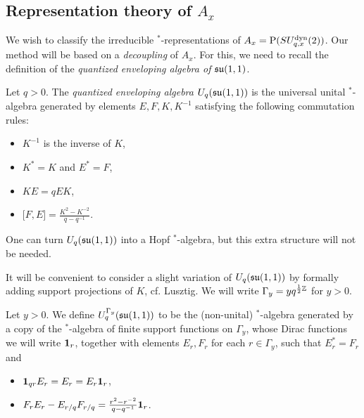 \subsection{Representation theory of $A_x$}

We wish to classify the irreducible $^*$-representations of $A_x= \operatorname{\mathrm{P}}(SU_{q,x}^{\operatorname{\mathrm{dyn}}}(2))$. Our method will be based on a \emph{decoupling} of $A_x$. For this, we need to recall the definition of the \emph{quantized enveloping algebra of $\mathfrak{su}(1,1)$}. %

\begin{Def} Let $q>0$. The \emph{quantized enveloping algebra $U_q(\mathfrak{su}(1,1))$} is the universal unital $^*$-algebra generated by elements $E,F,K,K^{-1}$ satisfying the following commutation rules: 
\begin{itemize}
\item $K^{-1}$ is the inverse of $K$, 
\item $K^* = K$ and $E^* = F$, 
\item $KE = qEK$,
\item $\lbrack F,E\rbrack = \frac{K^2-K^{-2}}{q-q^{-1}}$.
\end{itemize}
\end{Def}

One can turn $U_q(\mathfrak{su}(1,1))$ into a Hopf $^*$-algebra, but this extra structure will not be needed. 

It will be convenient to consider a slight variation of $U_q(\mathfrak{su}(1,1))$ by formally adding support projections of $K$, cf. Lusztig. We will write $\Gamma_y = yq^{\frac{1}{2}\mathbb{Z}}$  for $y>0$.

\begin{Def} Let $y>0$. We define $U_q^{\Gamma_y}(\mathfrak{su}(1,1))$ to be the (non-unital) $^*$-algebra generated by a copy of the $^*$-algebra of finite support functions on $\Gamma_y$, whose Dirac functions we will write $\mathbf{1}_r$, together with elements $E_{r},F_r$ for each $r\in \Gamma_y$, such that $E_{r}^* = F_{r}$ and 
\begin{itemize}
\item $\mathbf{1}_{qr}E_{r} = E_{r} = E_{r}\mathbf{1}_{r}$, 
\item $F_{r}E_{r} - E_{r/q}F_{r/q}  = \frac{r^2-r^{-2}}{q-q^{-1}} \mathbf{1}_{r}$.
\end{itemize}
\end{Def} 

